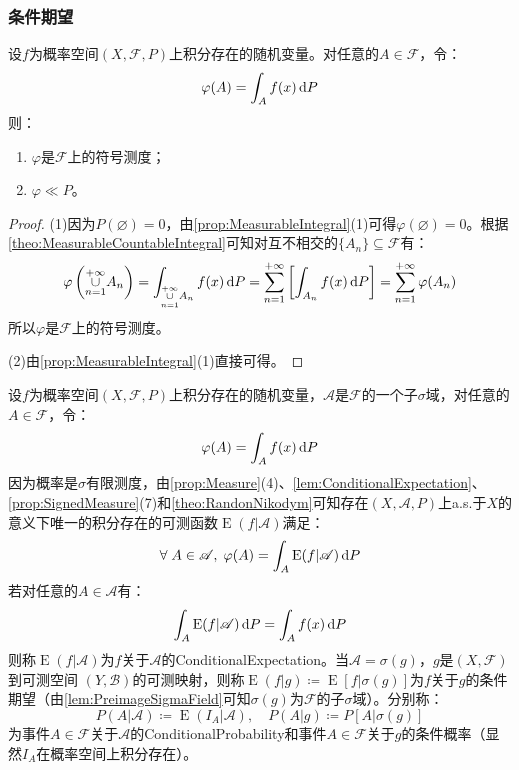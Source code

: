 \subsubsection{条件期望}
\begin{lemma}\label{lem:ConditionalExpectation}
	设$f$为概率空间$(X,\mathscr{F},P)$上积分存在的随机变量。对任意的$A\in\mathscr{F}$，令：
	\begin{equation*}
		\varphi(A)=\int_{A}f(x)\mathop{}\!\mathrm{d} P
	\end{equation*}
	则：
	\begin{enumerate}
		\item $\varphi$是$\mathscr{F}$上的符号测度；
		\item $\varphi\ll P$。
	\end{enumerate}
\end{lemma}
\begin{proof}
	(1)因为$P(\varnothing)=0$，由\cref{prop:MeasurableIntegral}(1)可得$\varphi(\varnothing)=0$。根据\cref{theo:MeasurableCountableIntegral}可知对互不相交的$\{A_n\}\subseteq\mathscr{F}$有：
	\begin{equation*}
		\varphi\left(\underset{n=1}{\overset{+\infty}{\cup}}A_n\right)=\int_{\underset{n=1}{\overset{+\infty}{\cup}}A_n}f(x)\mathop{}\!\mathrm{d} P=\sum_{n=1}^{+\infty}\left[\int_{A_n}f(x)\mathop{}\!\mathrm{d} P\right]=\sum_{n=1}^{+\infty}\varphi(A_n)
	\end{equation*}
	所以$\varphi$是$\mathscr{F}$上的符号测度。\par
	(2)由\cref{prop:MeasurableIntegral}(1)直接可得。
\end{proof}
\begin{definition}
	设$f$为概率空间$(X,\mathscr{F},P)$上积分存在的随机变量，$\mathscr{A}$是$\mathscr{F}$的一个子$\sigma$域，对任意的$A\in\mathscr{F}$，令：
	\begin{equation*}
		\varphi(A)=\int_{A}f(x)\mathop{}\!\mathrm{d} P
	\end{equation*}
	因为概率是$\sigma$有限测度，由\cref{prop:Measure}(4)、\cref{lem:ConditionalExpectation}、\cref{prop:SignedMeasure}(7)和\cref{theo:RandonNikodym}可知存在$(X,\mathscr{A},P)$上a.s.于$X$的意义下唯一的积分存在的可测函数$\operatorname{E}(f|\mathscr{A})$满足：
	\begin{equation*}
		\forall\;A\in\mathscr{A},\;\varphi(A)=\int_{A}\operatorname{E}(f|\mathscr{A})\mathop{}\!\mathrm{d} P
	\end{equation*}
	若对任意的$A\in\mathscr{A}$有：
	\begin{equation*}
		\int_{A}\operatorname{E}(f|\mathscr{A})\mathop{}\!\mathrm{d} P=\int_{A}f(x)\mathop{}\!\mathrm{d} P
	\end{equation*}
	则称$\operatorname{E}(f|\mathscr{A})$为$f$关于$\mathscr{A}$的\gls{ConditionalExpectation}。当$\mathscr{A}=\sigma(g)$，$g$是$(X,\mathscr{F})$到可测空间 $(Y,\mathscr{B})$的可测映射，则称$\operatorname{E}(f|g)\coloneq\operatorname{E}[f|\sigma(g)]$为$f$关于$g$的条件期望（由\cref{lem:PreimageSigmaField}可知$\sigma(g)$为$\mathscr{F}$的子$\sigma$域）。分别称：
	\begin{equation*}
		P(A|\mathscr{A})\coloneq\operatorname{E}(I_A|\mathscr{A}),\quad P(A|g)\coloneq P[A|\sigma(g)]
	\end{equation*}
	为事件$A\in\mathscr{F}$关于$\mathscr{A}$的\gls{ConditionalProbability}和事件$A\in\mathscr{F}$关于$g$的条件概率（显然$I_A$在概率空间上积分存在）。
\end{definition}
